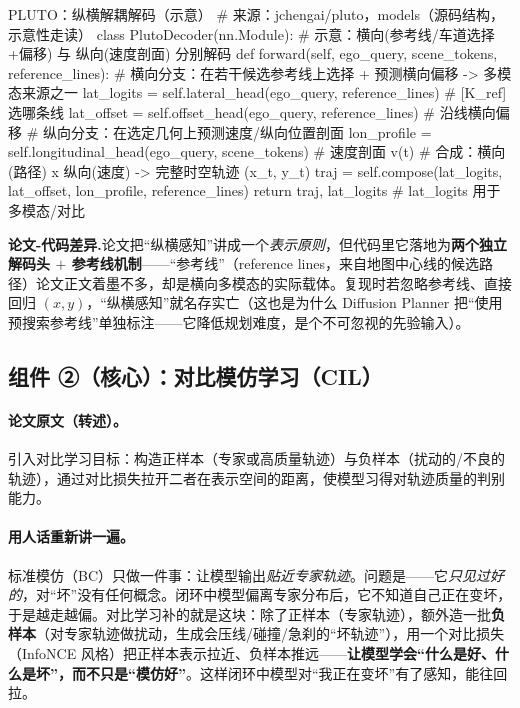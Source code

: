 \begin{codebox}[Python]{PLUTO：纵横解耦解码（示意）}
# 来源：jchengai/pluto，models（源码结构，示意性走读）
class PlutoDecoder(nn.Module):  # 示意：横向(参考线/车道选择+偏移) 与 纵向(速度剖面) 分别解码
    def forward(self, ego_query, scene_tokens, reference_lines):
        # 横向分支：在若干候选参考线上选择 + 预测横向偏移 -> 多模态来源之一
        lat_logits = self.lateral_head(ego_query, reference_lines)   # [K_ref] 选哪条线
        lat_offset = self.offset_head(ego_query, reference_lines)    # 沿线横向偏移
        # 纵向分支：在选定几何上预测速度/纵向位置剖面
        lon_profile = self.longitudinal_head(ego_query, scene_tokens)  # 速度剖面 v(t)
        # 合成：横向(路径) x 纵向(速度) -> 完整时空轨迹 (x_t, y_t)
        traj = self.compose(lat_logits, lat_offset, lon_profile, reference_lines)
        return traj, lat_logits     # lat_logits 用于多模态/对比
\end{codebox}

\begin{note}
\textbf{论文-代码差异.}\;论文把“纵横感知”讲成一个\emph{表示原则}，但代码里它落地为\textbf{两个独立解码头 $+$ 参考线机制}——“参考线”（reference lines，来自地图中心线的候选路径）论文正文着墨不多，却是横向多模态的实际载体。复现时若忽略参考线、直接回归 $(x,y)$，“纵横感知”就名存实亡（这也是为什么 Diffusion Planner 把“使用预搜索参考线”单独标注——它降低规划难度，是个不可忽视的先验输入）。
\end{note}

\subsection{组件 ②（核心）：对比模仿学习（CIL）}
\label{sec:de-cil}

\paragraph{论文原文（转述）。}
引入对比学习目标：构造正样本（专家或高质量轨迹）与负样本（扰动的/不良的轨迹），通过对比损失拉开二者在表示空间的距离，使模型习得对轨迹质量的判别能力\cite{cheng2024pluto}。

\paragraph{用人话重新讲一遍。}
标准模仿（BC）只做一件事：让模型输出\emph{贴近专家轨迹}。问题是——它\emph{只见过好的}，对“坏”没有任何概念。闭环中模型偏离专家分布后，它不知道自己正在变坏，于是越走越偏。对比学习补的就是这块：除了正样本（专家轨迹），额外造一批\textbf{负样本}（对专家轨迹做扰动，生成会压线/碰撞/急刹的“坏轨迹”），用一个对比损失（InfoNCE 风格）把正样本表示拉近、负样本推远——\textbf{让模型学会“什么是好、什么是坏”，而不只是“模仿好”}。这样闭环中模型对“我正在变坏”有了感知，能往回拉。

